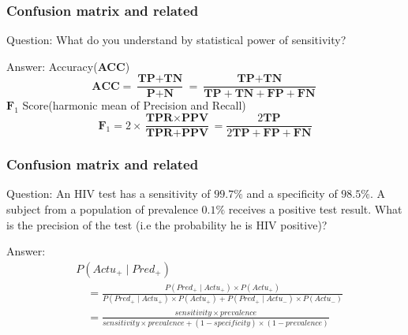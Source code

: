 \documentclass[11pt]{beamer}
\begin{document}
\begin{frame}
\frametitle{Confusion matrix and related}
\begin{block}{Question:}
	What do you understand by statistical power of sensitivity?
\end{block}
\begin{block}{Answer:}
	Accuracy(\textbf{ACC})
	\[
		\textbf{ACC} = \frac{\textbf{TP}+\textbf{TN}}{\textbf{P}+\textbf{N}} = \frac{\textbf{TP}+\textbf{TN}}{\textbf{TP}+\textbf{TN} + \textbf{FP}+\textbf{FN}}
	\]
	$\textbf{F}_1$ Score(harmonic mean of Precision and Recall)
	\[
		\textbf{F}_1 = 2\times\frac{\textbf{TPR}\times\textbf{PPV}}{\textbf{TPR} + \textbf{PPV}} = \frac{2\textbf{TP}}{2\textbf{TP}+\textbf{FP}+\textbf{FN}}
	\]
\end{block}
\end{frame}

\begin{frame}
\frametitle{Confusion matrix and related}
\begin{block}{Question:}
	An HIV test has a sensitivity of $99.7\%$ and a specificity of $98.5\%$. A subject from a population of prevalence $0.1\%$ receives a positive test result. What is the precision of the test (i.e the probability he is HIV positive)?
\end{block}
\begin{block}{Answer:}
	\begin{align*}
	&P(Actu_+\mid Pred_+)\\ &\quad= \frac{P( Pred_+\mid Actu_+)\times P(Actu_+)}{P( Pred_+\mid Actu_+)\times P(Actu_+) + P( Pred_+\mid Actu_-)\times P(Actu_-)}\\
	&\quad=\frac{sensitivity\times prevalence}{sensitivity\times prevalence + (1 - specificity)\times(1-prevalence)}\\
	\end{align*}
\end{block}
\end{frame}
\end{document}

